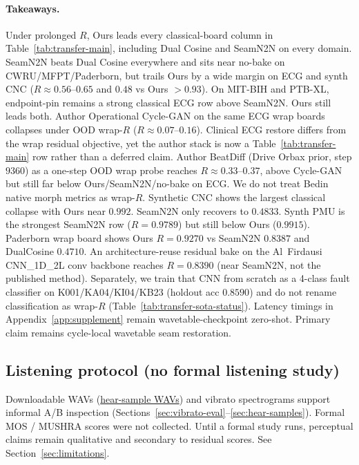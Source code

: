 \paragraph{Takeaways.}
Under prolonged $R$, Ours leads every classical-board column in Table~\ref{tab:transfer-main},
including Dual Cosine and SeamN2N on every domain.
SeamN2N beats Dual Cosine everywhere and sits near no-bake on CWRU/MFPT/Paderborn, but trails Ours by a wide margin
on ECG and synth CNC ($R{\approx}0.56$--$0.65$ and $0.48$ vs Ours ${>}0.93$).
On MIT-BIH and PTB-XL, endpoint-pin remains a strong classical ECG row above SeamN2N. Ours still leads both.
Author Operational Cycle-GAN on the same ECG wrap boards collapses under OOD wrap-$R$
($R{\approx}0.07$--$0.16$).
Clinical ECG restore differs from the wrap residual objective, yet the author stack
is now a Table~\ref{tab:transfer-main} row rather than a deferred claim.
Author BeatDiff (Drive Orbax prior, step $9360$) as a one-step OOD wrap probe reaches
$R{\approx}0.33$--$0.37$, above Cycle-GAN but still far below Ours/SeamN2N/no-bake on ECG.
We do not treat Bedin native morph metrics as wrap-$R$.
Synthetic CNC shows the largest classical collapse with Ours near $0.992$. SeamN2N only recovers to $0.4833$.
Synth PMU is the strongest SeamN2N row ($R{=}0.9789$) but still below Ours ($0.9915$).
Paderborn wrap board shows Ours $R{=}0.9270$ vs SeamN2N $0.8387$ and DualCosine $0.4710$.
An architecture-reuse residual bake on the Al~Firdausi CNN\_1D\_2L conv backbone reaches
$R{=}0.8390$ (near SeamN2N, not the published method).
Separately, we train that CNN from scratch as a 4-class fault classifier on
K001/KA04/KI04/KB23 (holdout acc $0.8590$) and do not rename classification as wrap-$R$
(Table~\ref{tab:transfer-sota-status}).
Latency timings in Appendix~\ref{app:supplement} remain wavetable-checkpoint zero-shot.
Primary claim remains cycle-local wavetable seam restoration.

\subsection{Listening protocol (no formal listening study)}
\label{sec:listening-protocol}

Downloadable WAVs
(\href{https://github.com/reeldemo/reelsynth/tree/main/brand/artifacts/meta_approach_compare/hear_samples}{hear-sample WAVs})
and vibrato spectrograms support informal A/B inspection
(Sections~\ref{sec:vibrato-eval}--\ref{sec:hear-samples}).
Formal MOS / MUSHRA scores were not collected.
Until a formal study runs, perceptual claims remain qualitative and secondary to residual scores.
See Section~\ref{sec:limitations}.
